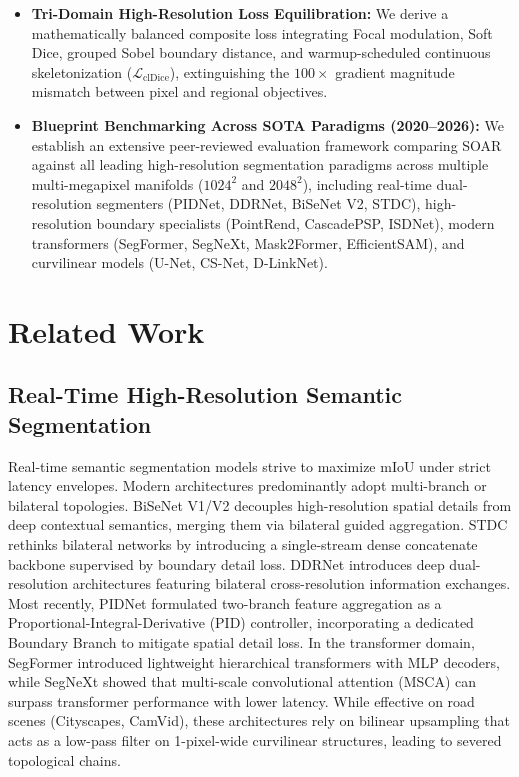 \documentclass[11pt,a4paper]{article}
\begin{document}
\begin{itemize}
    \item \textbf{Tri-Domain High-Resolution Loss Equilibration:} We derive a mathematically balanced composite loss integrating Focal modulation, Soft Dice, grouped Sobel boundary distance, and warmup-scheduled continuous skeletonization ($\mathcal{L}_{\text{clDice}}$), extinguishing the $100\times$ gradient magnitude mismatch between pixel and regional objectives.
    \item \textbf{Blueprint Benchmarking Across SOTA Paradigms (2020--2026):} We establish an extensive peer-reviewed evaluation framework comparing SOAR against all leading high-resolution segmentation paradigms across multiple multi-megapixel manifolds ($1024^2$ and $2048^2$), including real-time dual-resolution segmenters (PIDNet, DDRNet, BiSeNet V2, STDC), high-resolution boundary specialists (PointRend, CascadePSP, ISDNet), modern transformers (SegFormer, SegNeXt, Mask2Former, EfficientSAM), and curvilinear models (U-Net, CS-Net, D-LinkNet).
\end{itemize}

\section{Related Work}

\subsection{Real-Time High-Resolution Semantic Segmentation}
Real-time semantic segmentation models strive to maximize mIoU under strict latency envelopes. Modern architectures predominantly adopt multi-branch or bilateral topologies. BiSeNet V1/V2 \cite{yu2021bisenet} decouples high-resolution spatial details from deep contextual semantics, merging them via bilateral guided aggregation. STDC \cite{fan2021rethinking} rethinks bilateral networks by introducing a single-stream dense concatenate backbone supervised by boundary detail loss. DDRNet \cite{hong2021deep} introduces deep dual-resolution architectures featuring bilateral cross-resolution information exchanges. Most recently, PIDNet \cite{xu2023pidnet} formulated two-branch feature aggregation as a Proportional-Integral-Derivative (PID) controller, incorporating a dedicated Boundary Branch to mitigate spatial detail loss. In the transformer domain, SegFormer \cite{xie2021segformer} introduced lightweight hierarchical transformers with MLP decoders, while SegNeXt \cite{guo2022segnext} showed that multi-scale convolutional attention (MSCA) can surpass transformer performance with lower latency. While effective on road scenes (Cityscapes, CamVid), these architectures rely on bilinear upsampling that acts as a low-pass filter on 1-pixel-wide curvilinear structures, leading to severed topological chains.
\end{document}
